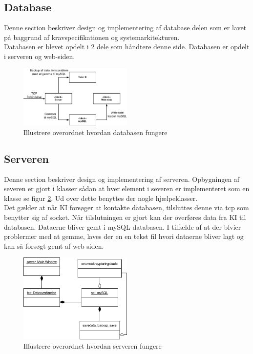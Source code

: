 \subsection{Database}
Denne section beskriver design og implementering af database delen som er lavet på baggrund af kravspecifikationen og systemarkitekturen.\\
Databasen er blevet opdelt i 2 dele som håndtere denne side. Databasen er opdelt i serveren og web-siden.
\begin{figure}[H]
\centering
\includegraphics[width = 0.5\textwidth]{billeder/database_to_mysql}
\caption{Illustrere overordnet hvordan databasen fungere}
\label{fig:server_to_mysql}
\end{figure}

\subsection{Serveren}
Denne section beskriver design og implementering af serveren.
Opbygningen af severen er gjort i klasser sådan at hver element i severen er implementeret som en klasse se figur \ref{fig:database_server}. Ud over dette benyttes der nogle hjælpeklasser.\\

Det gælder at når KI forsøger at kontakte databasen, tilsluttes denne via tcp som benytter sig af socket. Når tilslutningen er gjort kan der overføres data fra KI til databasen. Dataerne bliver gemt i mySQL databasen. I tilfælde af at der blvier problermer med at gemme, laves der en en tekst fil hvori dataerne bliver lagt og kan så forsøgt gemt af web siden.
\begin{figure}[H]
\centering
\includegraphics[width = 0.5\textwidth]{billeder/database_server}
\caption{Illustrere overordnet hvordan serveren fungere}
\label{fig:database_server}
\end{figure}

